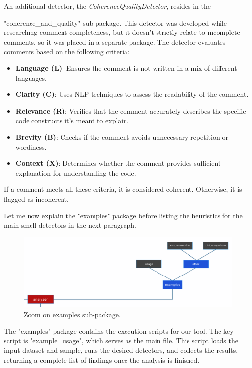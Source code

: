 \noindent An additional detector, the \textit{CoherenceQualityDetector}, resides in the 

\noindent "coherence\_and\_quality" sub-package. This detector was developed while researching comment completeness, but it doesn’t strictly relate to incomplete comments, so it was placed in a separate package. The detector evaluates comments based on the following criteria:
	\begin{itemize}
		\item \textbf{Language (L)}: Ensures the comment is not written in a mix of different languages.
		\item \textbf{Clarity (C)}: Uses NLP techniques to assess the readability of the comment.
		\item \textbf{Relevance (R)}: Verifies that the comment accurately describes the specific code constructs it’s meant to explain.
		\item \textbf{Brevity (B)}: Checks if the comment avoids unnecessary repetition or wordiness.
		\item \textbf{Context (X)}: Determines whether the comment provides sufficient explanation for understanding the code.
	\end{itemize}
If a comment meets all these criteria, it is considered coherent. Otherwise, it is flagged as incoherent.

\noindent Let me now explain the "examples" package before listing the heuristics for the main smell detectors in the next paragraph.

\begin{figure}[ht]
	\centering\includegraphics[width=400pt]{figs/zoom-examples.PNG}
	\captionsetup{justification=centering}
	\caption{Zoom on examples sub-package.}
	\label{fig:zoom-examples}
\end{figure}

\noindent The "examples" package contains the execution scripts for our tool. The key script is "example\_usage", which serves as the main file. This script loads the input dataset and sample, runs the desired detectors, and collects the results, returning a complete list of findings once the analysis is finished.

